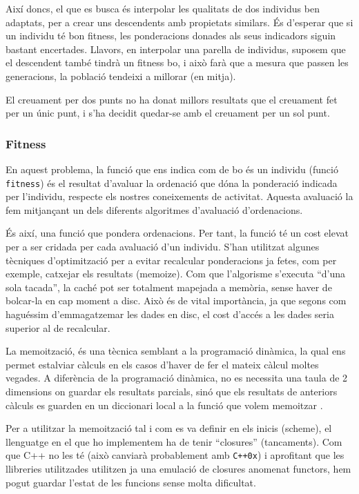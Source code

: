 Així doncs, el que es busca és interpolar les qualitats de dos individus ben
adaptats, per a crear uns descendents amb propietats similars.  És d'esperar que
si un individu té bon fitness, les ponderacions donades als seus indicadors
siguin bastant encertades.  Llavors, en interpolar una parella de individus,
suposem que el descendent també tindrà un fitness bo, i això farà que a mesura
que passen les generacions, la població tendeixi a millorar (en mitja).

El creuament per dos punts no ha donat millors resultats que el creuament fet
per un únic punt, i s'ha decidit quedar-se amb el creuament per un sol punt.

\subsubsection{Fitness} %
\label{ssub:PFitness}
En aquest problema, la funció que ens indica com de bo és un individu (funció
\texttt{fitness}) és el resultat d'avaluar la ordenació que dóna la ponderació
indicada per l'individu, respecte els nostres coneixements de activitat. Aquesta
avaluació la fem mitjançant un dels diferents algoritmes d'avaluació d'ordenacions.


És així, una funció que pondera ordenacions.  Per tant, la funció té un cost
elevat per a ser cridada per cada avaluació d'un individu.  S'han utilitzat
algunes tècniques d'optimització per a evitar recalcular ponderacions ja fetes,
com per exemple, catxejar els resultats (memoize).  Com que l'algorisme
s'executa ``d'una sola tacada'', la caché pot ser totalment mapejada a memòria,
sense haver de bolcar-la en cap moment a disc.  Això és de vital importància, ja
que segons com haguéssim d'emmagatzemar les dades en disc, el cost d'accés a les
dades seria superior al de recalcular. 

La memoització, és una tècnica semblant a la programació dinàmica, la qual ens
permet estalviar càlculs en els casos d'haver de fer el mateix càlcul moltes
vegades.  A diferència de la programació dinàmica, no es necessita una taula de
2 dimensions on guardar els resultats parcials, sinó que els resultats de
anteriors càlculs es guarden en un diccionari local a la funció que volem
memoitzar \cite{MJD05}. 

Per a utilitzar la memoització tal i com es va definir en els inicis
(scheme), el llenguatge en el que ho implementem ha de tenir ``closures''
(tancaments).  Com que C++ no les té (això canviarà probablement amb
\texttt{C++0x})
i aprofitant que les llibreries utilitzades utilitzen ja una emulació de
closures anomenat functors, hem pogut guardar l'estat de les funcions sense
molta dificultat. 

